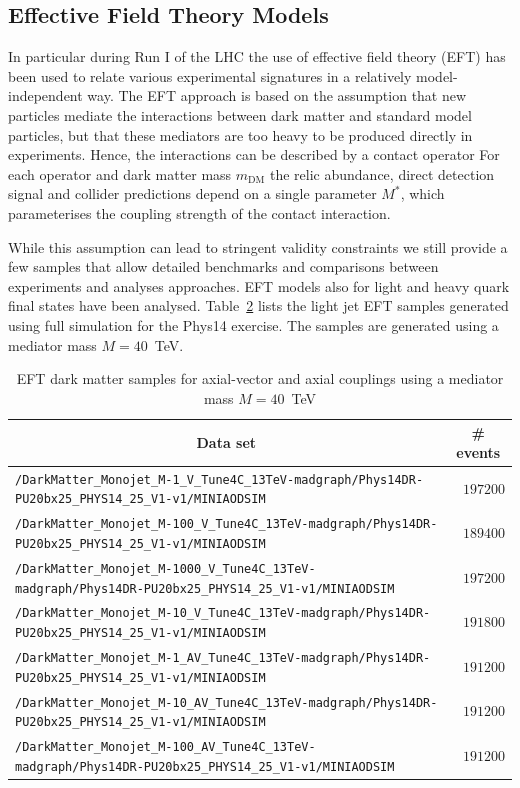 \begin{table}[h!]
\clearpage

\subsection{Effective Field Theory Models}


In particular during Run I of the LHC the use of effective field theory (EFT) has been used to relate various experimental signatures in a relatively model-independent way. 
The EFT approach is based on the assumption that new particles mediate the interactions between dark matter and standard model particles, but that these mediators are too heavy to be
 produced directly in experiments. Hence, the interactions can be described by a contact operator For each operator and dark matter mass $m_\textrm{DM}$ the relic abundance, direct detection signal
 and collider predictions depend on a single parameter $M^*$, which parameterises the coupling strength of the contact interaction. 

While this assumption can lead to stringent validity constraints we still provide a few samples that allow detailed benchmarks and comparisons between experiments and analyses approaches.
EFT models also for light and heavy quark final states have been analysed.
Table~\ref{tab:datasets_dm} lists the light jet EFT samples generated using full simulation for the Phys14 exercise. The samples are generated using a mediator mass $M=40$~TeV.

\begin{table}
    \centering
    \caption{EFT dark matter samples for axial-vector and axial couplings using a mediator mass $M=40$~TeV \label{tab:datasets_dm}}
    \begin{tabular}{lr}
      \hline\hline
      \multicolumn{1}{c}{Data set}&\multicolumn{1}{c}{\# events}\tabularnewline
      \hline
      {\footnotesize \verb!/DarkMatter_Monojet_M-1_V_Tune4C_13TeV-madgraph/Phys14DR-PU20bx25_PHYS14_25_V1-v1/MINIAODSIM!   } &$197200$\tabularnewline
      {\footnotesize \verb!/DarkMatter_Monojet_M-100_V_Tune4C_13TeV-madgraph/Phys14DR-PU20bx25_PHYS14_25_V1-v1/MINIAODSIM! } &$189400$\tabularnewline
      {\footnotesize \verb!/DarkMatter_Monojet_M-1000_V_Tune4C_13TeV-madgraph/Phys14DR-PU20bx25_PHYS14_25_V1-v1/MINIAODSIM!} &$197200$\tabularnewline
      {\footnotesize \verb!/DarkMatter_Monojet_M-10_V_Tune4C_13TeV-madgraph/Phys14DR-PU20bx25_PHYS14_25_V1-v1/MINIAODSIM!  } &$191800$\tabularnewline
      {\footnotesize \verb!/DarkMatter_Monojet_M-1_AV_Tune4C_13TeV-madgraph/Phys14DR-PU20bx25_PHYS14_25_V1-v1/MINIAODSIM!  } &$191200$\tabularnewline
      {\footnotesize \verb!/DarkMatter_Monojet_M-10_AV_Tune4C_13TeV-madgraph/Phys14DR-PU20bx25_PHYS14_25_V1-v1/MINIAODSIM! } &$191200$\tabularnewline
      {\footnotesize \verb!/DarkMatter_Monojet_M-100_AV_Tune4C_13TeV-madgraph/Phys14DR-PU20bx25_PHYS14_25_V1-v1/MINIAODSIM!} &$191200$\tabularnewline
\hline
\end{tabular}
\end{table}



\end{table}
